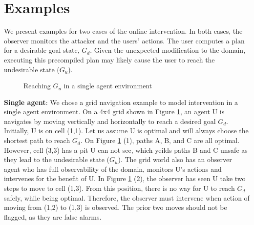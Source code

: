 \section{Examples}
\label{sec:example}
We present examples for two cases of the online intervention. In both cases, the observer monitors the attacker and the users' actions. The user computes a plan for a desirable goal state, $G_d$. Given the unexpected modification to the domain, executing this precompiled plan may likely cause the user to reach the undesirable state ($G_u$).

\begin{figure}[ht]
	 \vspace{0.1mm}
	\caption{Reaching $G_u$ in a single agent environment}
	\label{fig:single}
\end{figure}


\textbf{Single agent}: We chose a grid navigation example to model intervention in a single agent environment. On a 4x4 grid shown in Figure \ref{fig:single}, an agent U is navigates by moving vertically and horizontally to reach a desired goal $G_d$. Initially, U is on cell (1,1). Let us assume U is optimal and will always choose the shortest path to reach $G_d$. On Figure \ref{fig:single} (1), paths A, B, and C are all optimal. However, cell (3,3) has a pit U can not see, which yeilds paths B and C unsafe as they lead to the undesirable state ($G_u$). The grid world also has an observer agent who has full observability of the domain, monitors U's actions and intervenes for the benefit of U. In Figure \ref{fig:single} (2), the observer has seen U take two steps to move to cell (1,3). From this position, there is no way for U to reach $G_d$ safely, while being optimal. Therefore, the observer must intervene when action of moving from (1,2) to (1,3) is observed. The prior two moves should not be flagged, as they are false alarms.



